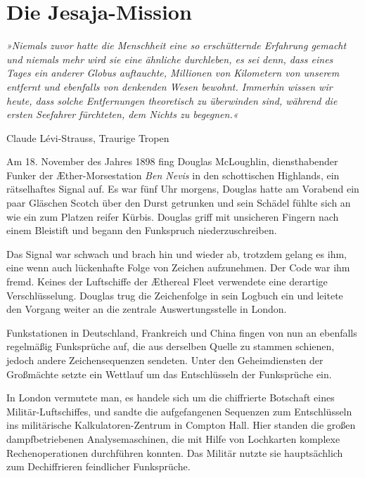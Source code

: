 \section{Die Jesaja-Mission}

\textit{»Niemals zuvor hatte die Menschheit eine so erschütternde Erfahrung
gemacht und niemals mehr wird sie eine ähnliche durchleben, es sei
denn, dass eines Tages ein anderer Globus auftauchte, Millionen von
Kilometern von unserem entfernt und ebenfalls von denkenden Wesen
bewohnt. Immerhin wissen wir heute, dass solche Entfernungen
theoretisch zu überwinden sind, während die ersten Seefahrer
fürchteten, dem Nichts zu begegnen.«
}

\begin{flushright}
Claude Lévi-Strauss, Traurige Tropen
\end{flushright}

\bigpar

Am 18. November des Jahres 1898 fing Douglas McLoughlin,
diensthabender Funker der Æther-Morsestation \textit{Ben Nevis} in den
schottischen Highlands, ein rätselhaftes Signal auf. Es war fünf
Uhr morgens, Douglas hatte am Vorabend ein paar Gläschen Scotch
über den Durst getrunken und sein Schädel fühlte sich an wie ein
zum Platzen reifer Kürbis. Douglas griff mit unsicheren Fingern
nach einem Bleistift und begann den Funkspruch niederzuschreiben.

Das Signal war schwach und brach hin und wieder ab, trotzdem gelang
es ihm, eine wenn auch lückenhafte Folge von Zeichen aufzunehmen.
Der Code war ihm fremd. Keines der Luftschiffe der Æthereal Fleet
verwendete eine derartige Verschlüsselung. Douglas trug die
Zeichenfolge in sein Logbuch ein und leitete den Vorgang weiter an
die zentrale Auswertungsstelle in London.

\bigpar

Funkstationen in Deutschland, Frankreich und China fingen von nun
an ebenfalls regelmäßig Funksprüche auf, die aus derselben Quelle
zu stammen schienen, jedoch andere Zeichensequenzen sendeten. Unter
den Geheimdiensten der Großmächte setzte ein Wettlauf um das
Entschlüsseln der Funksprüche ein.

\bigpar

In London vermutete man, es handele sich um die chiffrierte
Botschaft eines Militär-Luftschiffes, und sandte die aufgefangenen
Sequenzen zum Entschlüsseln ins militärische Kalkulatoren-Zentrum
in Compton Hall. Hier standen die großen dampfbetriebenen
Analysemaschinen, die mit Hilfe von Lochkarten komplexe
Rechenoperationen durchführen konnten. Das Militär nutzte sie
hauptsächlich zum Dechiffrieren feindlicher Funksprüche.

